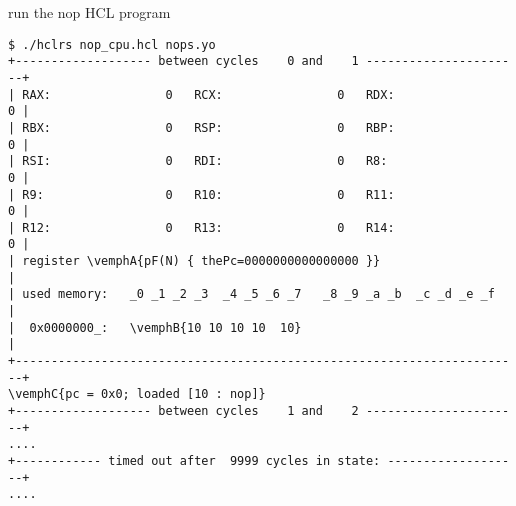 \begin{frame}[fragile,label=runSim2]{run the nop HCL program}
\begin{Verbatim}[fontsize=\fontsize{8}{9}\selectfont,commandchars=\\\{\}]
$ ./hclrs nop_cpu.hcl nops.yo
+------------------- between cycles    0 and    1 ----------------------+
| RAX:                0   RCX:                0   RDX:                0 |
| RBX:                0   RSP:                0   RBP:                0 |
| RSI:                0   RDI:                0   R8:                 0 |
| R9:                 0   R10:                0   R11:                0 |
| R12:                0   R13:                0   R14:                0 |
| register \vemphA{pF(N) { thePc=0000000000000000 }}                             |
| used memory:   _0 _1 _2 _3  _4 _5 _6 _7   _8 _9 _a _b  _c _d _e _f    |
|  0x0000000_:   \vemphB{10 10 10 10  10}                                        |
+-----------------------------------------------------------------------+
\vemphC{pc = 0x0; loaded [10 : nop]}
+------------------- between cycles    1 and    2 ----------------------+
....
+------------ timed out after  9999 cycles in state: -------------------+
....
\end{Verbatim}
\end{frame}
